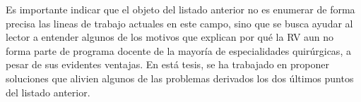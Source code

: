 
Es importante indicar que el objeto del listado anterior no es enumerar de forma precisa las lineas de trabajo actuales en este campo, sino que se busca ayudar al lector a entender algunos de los motivos que explican por qué la \ac{RV} aun no forma parte de programa docente de la mayoría de especialidades quirúrgicas, a pesar de sus evidentes ventajas. En está tesis, se ha trabajado en proponer soluciones que alivien algunos de las problemas derivados los dos últimos puntos del listado anterior.






